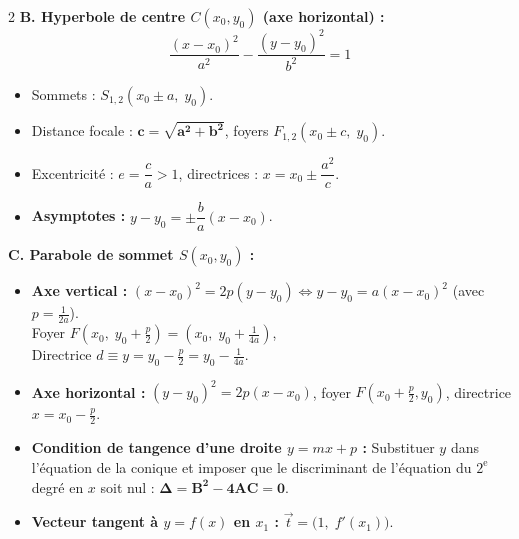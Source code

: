 {\begin{multicols}{2}
\vspace{3pt}
\noindent\textbf{B. Hyperbole de centre $C(x_0, y_0)$ (axe horizontal) :}
\[
    \frac{(x-x_0)^2}{a^2} - \frac{(y-y_0)^2}{b^2} = 1
\]
\begin{itemize}[leftmargin=1.2em, itemsep=1.5pt, topsep=2pt]
    \item Sommets : $S_{1,2}(x_0 \pm a,\; y_0)$.
    \item Distance focale : $\mathbf{c = \sqrt{a^2 + b^2}}$, \; foyers $F_{1,2}(x_0 \pm c,\; y_0)$.
    \item Excentricité : $e = \dfrac{c}{a} > 1$, \; directrices : $x = x_0 \pm \dfrac{a^2}{c}$.
    \item \textbf{Asymptotes :} $y - y_0 = \pm \dfrac{b}{a}(x - x_0)$.
\end{itemize}

\vspace{3pt}
\noindent\textbf{C. Parabole de sommet $S(x_0, y_0)$ :}
\begin{itemize}[leftmargin=1.2em, itemsep=1.5pt, topsep=2pt]
    \item \textbf{Axe vertical :} $(x-x_0)^2 = 2p(y-y_0) \iff y - y_0 = a(x-x_0)^2$ (avec $p = \frac{1}{2a}$).\\
    Foyer $F\left(x_0,\; y_0 + \frac{p}{2}\right) = \left(x_0,\; y_0 + \frac{1}{4a}\right)$,\\
    Directrice $d \equiv y = y_0 - \frac{p}{2} = y_0 - \frac{1}{4a}$.
    \item \textbf{Axe horizontal :} $(y-y_0)^2 = 2p(x-x_0)$, foyer $F\left(x_0 + \frac{p}{2}, y_0\right)$, directrice $x = x_0 - \frac{p}{2}$.
\end{itemize}

\vspace{3pt}
\begin{itemize}[leftmargin=1.2em, itemsep=1.5pt, topsep=2pt]
    \item \textbf{Condition de tangence d'une droite $y = mx+p$ :} Substituer $y$ dans l'équation de la conique et imposer que le discriminant de l'équation du $2^{\text{e}}$ degré en $x$ soit nul : $\mathbf{\Delta = B^2 - 4AC = 0}$.
    \item \textbf{Vecteur tangent à $y = f(x)$ en $x_1$ :} $\vec{t} = \bigl(1,\; f'(x_1)\bigr)$.
\end{itemize}

\end{multicols}
}

\newpage
\thispagestyle{plain}

